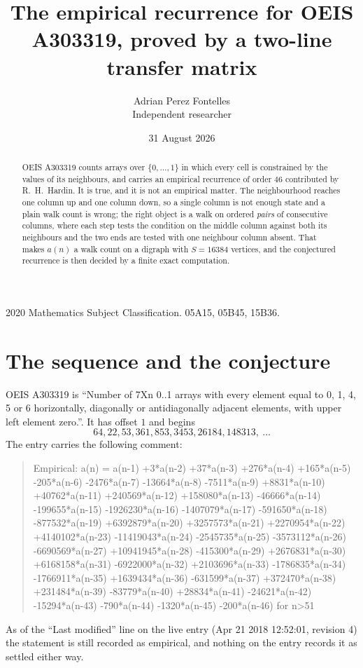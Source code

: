 \documentclass[11pt,a4paper]{article}
\title{The empirical recurrence for OEIS A303319, proved by a two-line transfer matrix}
\author{Adrian Perez Fontelles\\ \small Independent researcher}
\date{31 August 2026}
\theoremstyle{plain}
\theoremstyle{definition}
\begin{document}
\maketitle

\begin{abstract}
OEIS A303319 counts arrays over $\{0,\dots,1\}$ in which every cell is constrained by the
values of its neighbours, and carries an empirical recurrence of order $46$ contributed
by R.~H.~Hardin. It is true, and it is not an empirical matter. The neighbourhood reaches one
column up and one column down, so a single column is not enough state and a plain walk count
is wrong; the right object is a walk on ordered \emph{pairs} of consecutive columns, where
each step tests the condition on the middle column against both its neighbours and the two
ends are tested with one neighbour column absent. That makes $a(n)$ a walk count on a digraph
with $S=16384$ vertices, and the conjectured recurrence is then decided by a finite exact
computation.
\end{abstract}

\noindent\small 2020 Mathematics Subject Classification. 05A15, 05B45, 15B36.\normalsize

\section{The sequence and the conjecture}

OEIS A303319 is ``Number of 7Xn 0..1 arrays with every element equal to 0, 1, 4, 5 or 6 horizontally, diagonally or antidiagonally adjacent elements, with upper left element zero.''. It has offset $1$ and begins
\[
64, 22, 53, 361, 853, 3453, 26184, 148313,\ \dots
\]
The entry carries the following comment:
\begin{quote}\small
Empirical: a(n) = a(n-1) +3*a(n-2) +37*a(n-3) +276*a(n-4) +165*a(n-5) -205*a(n-6) -2476*a(n-7) -13664*a(n-8) -7511*a(n-9) +8831*a(n-10) +40762*a(n-11) +240569*a(n-12) +158080*a(n-13) -46666*a(n-14) -199655*a(n-15) -1926230*a(n-16) -1407079*a(n-17) -591650*a(n-18) -877532*a(n-19) +6392879*a(n-20) +3257573*a(n-21) +2270954*a(n-22) +4140102*a(n-23) -11419043*a(n-24) -2545735*a(n-25) -3573112*a(n-26) -6690569*a(n-27) +10941945*a(n-28) -415300*a(n-29) +2676831*a(n-30) +6168158*a(n-31) -6922000*a(n-32) +2103696*a(n-33) -1786835*a(n-34) -1766911*a(n-35) +1639434*a(n-36) -631599*a(n-37) +372470*a(n-38) +231484*a(n-39) -83779*a(n-40) +28834*a(n-41) -24621*a(n-42) -15294*a(n-43) -790*a(n-44) -1320*a(n-45) -200*a(n-46) for n>51
\end{quote}
As of the ``Last modified'' line on the live entry (Apr 21 2018 12:52:01, revision 4) the statement is
still recorded as empirical, and nothing on the entry records it as settled either way.
\end{document}
